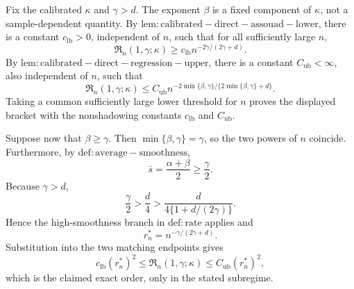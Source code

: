 Fix the calibrated \(\kappa\) and \(\gamma>d\). The exponent \(\beta\) is a fixed component of \(\kappa\), not a sample-dependent quantity. By \(\mathrm{lem:calibrated-direct-assouad-lower}\), there is a constant \(c_{\mathrm{lb}}>0\), independent of \(n\), such that for all sufficiently large \(n\),
\[
\mathfrak R_n(1,\gamma;\kappa)\ge c_{\mathrm{lb}}n^{-2\gamma/(2\gamma+d)}.
\]
By \(\mathrm{lem:calibrated-direct-regression-upper}\), there is a constant \(C_{\mathrm{ub}}<\infty\), also independent of \(n\), such that
\[
\mathfrak R_n(1,\gamma;\kappa)
\le C_{\mathrm{ub}}n^{-2\min\{\beta,\gamma\}/\{2\min\{\beta,\gamma\}+d\}}.
\]
Taking a common sufficiently large lower threshold for \(n\) proves the displayed bracket with the nonshadowing constants \(c_{\mathrm{lb}}\) and \(C_{\mathrm{ub}}\).

Suppose now that \(\beta\ge\gamma\). Then \(\min\{\beta,\gamma\}=\gamma\), so the two powers of \(n\) coincide. Furthermore, by \(\mathrm{def:average-smoothness}\),
\[
\bar s=\frac{\alpha+\beta}{2}\ge\frac\gamma2.
\]
Because \(\gamma>d\),
\[
\frac\gamma2>\frac d4>
\frac{d}{4\{1+d/(2\gamma)\}}.
\]
Hence the high-smoothness branch in \(\mathrm{def:rate}\) applies and
\[
r_n^*=n^{-\gamma/(2\gamma+d)}.
\]
Substitution into the two matching endpoints gives
\[
c_{\mathrm{lb}}(r_n^*)^2
\le\mathfrak R_n(1,\gamma;\kappa)
\le C_{\mathrm{ub}}(r_n^*)^2,
\]
which is the claimed exact order, only in the stated subregime.